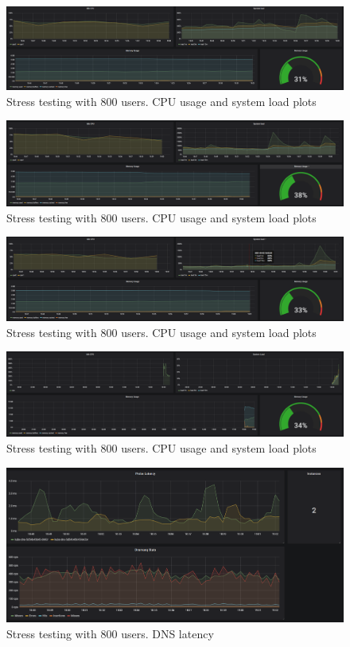 \documentclass[oneside]{article}
\begin{document}
\begin{figure}[H]
  \centering
  \includegraphics[width=\textwidth]{ tests/img1.png }
  \caption{Stress testing with 800 users. CPU usage and system load plots}
\end{figure}
\begin{figure}[H]
  \centering
  \includegraphics[width=\textwidth]{ tests/img2.png }
  \caption{Stress testing with 800 users. CPU usage and system load plots}
\end{figure}
\begin{figure}[H]
  \centering
  \includegraphics[width=\textwidth]{ tests/img3.png }
  \caption{Stress testing with 800 users. CPU usage and system load plots}
\end{figure}
\begin{figure}[H]
  \centering
  \includegraphics[width=\textwidth]{ tests/img4.png }
  \caption{Stress testing with 800 users. CPU usage and system load plots}
\end{figure}
\begin{figure}[H]
  \centering
  \includegraphics[width=\textwidth]{ tests/img5.png }
  \caption{Stress testing with 800 users. DNS latency}
  
\end{figure}
\end{document}

